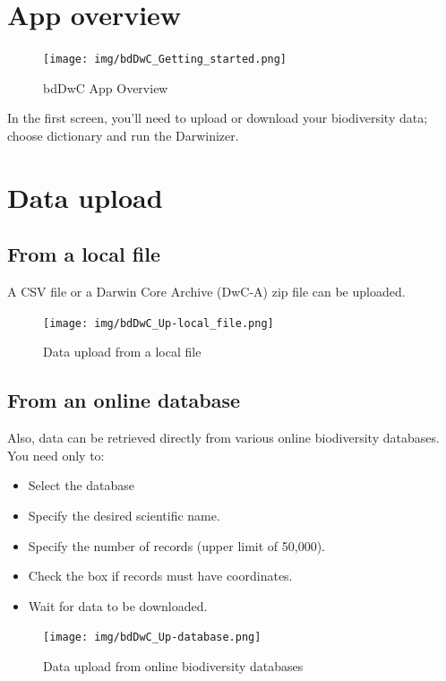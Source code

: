 \documentclass[]{book}
\providecommand{\tightlist}{%
  \setlength{\itemsep}{0pt}\setlength{\parskip}{0pt}}
\begin{document}
\section{App overview}\label{app-overview-1}

\begin{figure}
\centering
\texttt{[image: img/bdDwC\_Getting\_started.png]}
\caption{bdDwC App Overview}
\end{figure}

In the first screen, you'll need to upload or download your biodiversity
data; choose dictionary and run the Darwinizer.

\section{Data upload}\label{data-upload}

\subsection{From a local file}\label{from-a-local-file}

A CSV file or a Darwin Core Archive (DwC-A) zip file can be uploaded.

\begin{figure}
\centering
\texttt{[image: img/bdDwC\_Up-local\_file.png]}
\caption{Data upload from a local file}
\end{figure}

\subsection{From an online database}\label{from-an-online-database}

Also, data can be retrieved directly from various online biodiversity
databases. You need only to:

\begin{itemize}
\tightlist
\item
  Select the database
\item
  Specify the desired scientific name.
\item
  Specify the number of records (upper limit of 50,000).
\item
  Check the box if records must have coordinates.
\item
  Wait for data to be downloaded.
\end{itemize}

\begin{figure}
\centering
\texttt{[image: img/bdDwC\_Up-database.png]}
\caption{Data upload from online biodiversity databases}
\end{figure}
\end{document}
